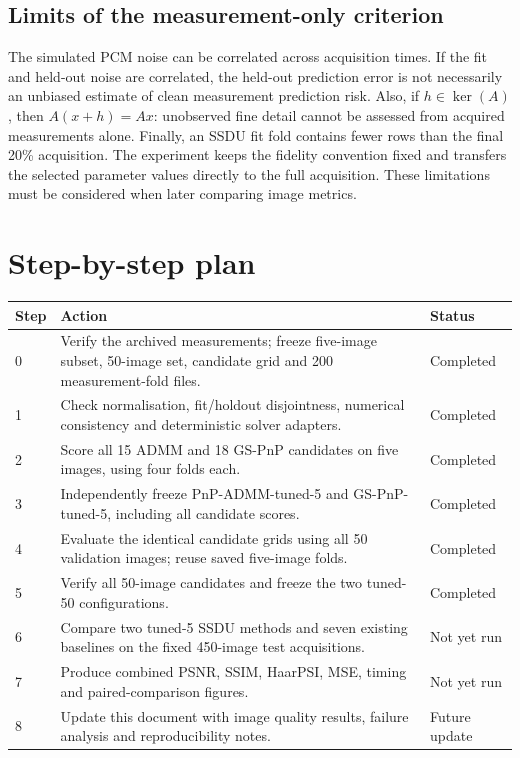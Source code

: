 \documentclass[a4paper,10pt]{article}
\begin{document}
\subsection*{Limits of the measurement-only criterion}

The simulated PCM noise can be correlated across acquisition times. If the fit and held-out noise are correlated, the held-out prediction error is not necessarily an unbiased estimate of clean measurement prediction risk. Also, if $h\in\ker(A)$, then $A(x+h)=Ax$: unobserved fine detail cannot be assessed from acquired measurements alone. Finally, an SSDU fit fold contains fewer rows than the final 20\% acquisition. The experiment keeps the fidelity convention fixed and transfers the selected parameter values directly to the full acquisition. These limitations must be considered when later comparing image metrics.

\section{Step-by-step plan}

\small
\begin{tabularx}{\linewidth}{@{}p{8mm}X p{22mm}@{}}
\toprule
\textbf{Step} & \textbf{Action} & \textbf{Status} \\
\midrule
0 & Verify the archived measurements; freeze five-image subset, 50-image set, candidate grid and 200 measurement-fold files. & Completed \\
1 & Check normalisation, fit/holdout disjointness, numerical consistency and deterministic solver adapters. & Completed \\
2 & Score all 15 ADMM and 18 GS-PnP candidates on five images, using four folds each. & Completed \\
3 & Independently freeze PnP-ADMM-tuned-5 and GS-PnP-tuned-5, including all candidate scores. & Completed \\
4 & Evaluate the identical candidate grids using all 50 validation images; reuse saved five-image folds. & Completed \\
5 & Verify all 50-image candidates and freeze the two tuned-50 configurations. & Completed \\
6 & Compare two tuned-5 SSDU methods and seven existing baselines on the fixed 450-image test acquisitions. & Not yet run \\
7 & Produce combined PSNR, SSIM, HaarPSI, MSE, timing and paired-comparison figures. & Not yet run \\
8 & Update this document with image quality results, failure analysis and reproducibility notes. & Future update \\
\bottomrule
\end{tabularx}
\normalsize
\end{document}
